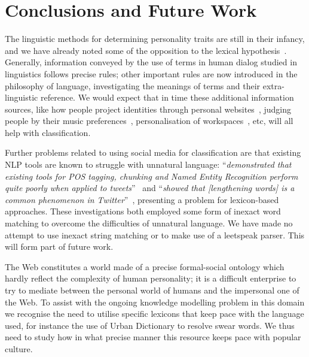 \documentclass{AISB2008}
\begin{document}
\section{Conclusions and Future Work}

The linguistic methods for determining personality traits are still in
their infancy, and we have already noted some of the opposition to the
lexical hypothesis~\cite{block:2010}. Generally, information conveyed
by the use of terms in human dialog studied in linguistics follows
precise rules; other important rules are now introduced in the
philosophy of language, investigating the meanings of terms and their
extra-linguistic reference. We would expect that in time these
additional information sources, like how people project identities
through personal websites~\cite{vazire+gosling:2004}, judging people
by their music preferences~\cite{rentfrow+gosling:2006},
personalisation of workspaces~\cite{wells+thelen:2002}, etc, will all
help with classification.

Further problems related to using social media for classification are
that existing NLP tools are known to struggle with unnatural language:
``{\emph{demonstrated that existing tools for POS tagging, chunking
and Named Entity Recognition perform quite poorly when applied to
tweets}}''~\cite{ritter-et-al:2011} and ``{\emph{showed that
[lengthening words] is a common phenomenon in
Twitter}}''~\cite{brody+diakopoulos:2011}, presenting a problem for
lexicon-based approaches. These investigations both employed some form
of inexact word matching to overcome the difficulties of unnatural
language. We have made no attempt to use inexact string matching or to
make use of a leetspeak parser. This will form part of future work.

The Web constitutes a world made of a precise formal-social ontology
which hardly reflect the complexity of human personality; it is a
difficult enterprise to try to mediate between the personal world of
humans and the impersonal one of the Web. To assist with the ongoing
knowledge modelling problem in this domain we recognise the need to
utilise specific lexicons that keep pace with the language used, for
instance the use of Urban Dictionary to resolve swear words. We thus
need to study how in what precise manner this resource keeps pace with
popular culture.


\end{document}
